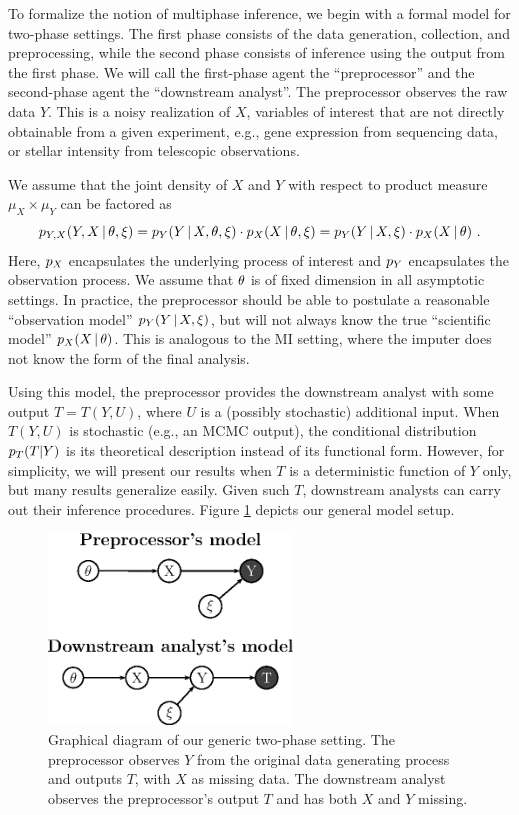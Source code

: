 To formalize the notion of multiphase inference, we begin with a formal model for two-phase settings.
The first phase consists of the data generation, collection, and preprocessing, while the second phase consists of inference using the output from the first phase.
We will call the first-phase agent the ``preprocessor'' and the second-phase agent the ``downstream analyst''.
The preprocessor observes the raw data $Y$.
This is a noisy realization of $X$, variables of interest that are not directly obtainable from a given experiment, e.g., gene expression from sequencing data, or stellar intensity from telescopic observations.

We assume that the joint density of $X$ and $Y$ with respect to product measure $\mu_X \times \mu_Y$ can be factored as 
\begin{equation}\label{multiphase:e:model}
 p_{Y,X}(Y,X \given \param, \obsparam) = \pobs(Y \given X, \param, \obsparam) \cdot\psci(X \given \param, \obsparam) = \pobs(Y \given X, \obsparam) \cdot \psci(X \given \param) \ .
\end{equation}
Here, $p_X$ encapsulates the underlying process of interest and $p_Y$ encapsulates the observation process.
We assume that $\theta$ is of fixed dimension in all asymptotic settings.
In practice, the preprocessor should be able to postulate a reasonable ``observation model'' $p_Y(Y \, | \, X, \xi)$, but will not always know the true ``scientific model'' $p_X(X \, | \, \theta)$.
This is analogous to the MI setting, where the imputer does not know the form of the final analysis.

Using this model, the preprocessor provides the downstream analyst with some output $T = T(Y, U)$, where $U$ is a (possibly stochastic) additional input.
When $T(Y, U)$ is stochastic (e.g., an MCMC output), the conditional distribution $p_T(T|Y)$ is its theoretical description  instead of its functional form.
However, for simplicity, we will present our results when $T$ is a deterministic function of $Y$ only, but many results generalize easily.
Given such $T$, downstream analysts can carry out their inference procedures.
Figure \ref{multiphase:fig:models} depicts our general model setup.
\begin{figure}
\centering
\includegraphics[height=2in]{figures/multiphase/diagram_model_vertical}
\caption{Graphical diagram of our  generic two-phase setting. The preprocessor  observes $Y$ from the original data generating process and outputs $T$, with $X$ as missing data. The downstream analyst observes the preprocessor's output $T$ and has both $X$ and $Y$ missing.\label{multiphase:fig:models}}
\end{figure}

